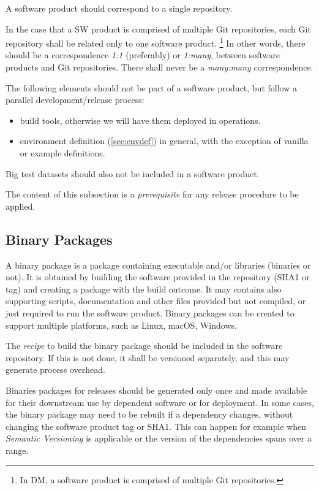A software product should correspond to a single repository.

In the case that a SW product is comprised of multiple Git repositories, each Git repository shall be related only to one software product.
\footnote{In DM, a software product is comprised of multiple Git repositories.}
In other words, there should be a correspondence \textit{1:1} (preferably) or \textit{1:many}, between software products and Git repositories.
There shall never be a \textit{many:many} correspondence.

The following elements should not be part of a software product, but follow a parallel development/release process:

\begin{itemize}
\item build tools, otherwise we will have them deployed in operations.
\item environment definition (\ref{sec:envdef}) in general, with the exception of vanilla or example definitions.
\end{itemize}

Big test datasets should also not be included in a software product. 

The content of this subsection is a \textit{prerequisite} for any release procedure to be applied.


\subsection{Binary Packages} \label{sec:swbpkg}

A binary package is a package containing executable and/or libraries (binaries or not).
It is obtained by building the software provided in the repository (SHA1 or tag) and creating a package with the build outcome. 
It may contains also supporting scripts, documentation and other files provided but not compiled, or just required to run the software product.
Binary packages can be created to support multiple platforms, such as Linux, macOS, Windows.

The \textit{recipe} to build the binary package should be included in the software repository.
If this is not done, it shall be versioned separately, and this may generate process overhead.

Binaries packages for releases should be generated only once and made available for their downstream use by dependent software or for deployment.
In some cases, the binary package may need to be rebuilt if a dependency changes, without changing the software product tag or SHA1.
This can happen for example when \textit{Semantic Versioning} is applicable or the version of the dependencies spans over a range.


